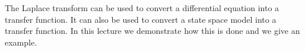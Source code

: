 \def\FileDate{99/10/06}
\def\FileVersion{1.2}

The Laplace transform can be used to convert a differential equation
into a transfer function. It can also be used to convert a state space
model into a transfer function. In this lecture we demonstrate how
this is done and we give an example.

\ifslidesonly
\begin{slide}
  
\end{slide}
\fi


\ifslidesonly
\begin{slide}
  
\end{slide}
\fi


\ifslidesonly
\begin{slide}
  
\end{slide}
\fi

\ifslidesonly
  \begin{slide}
    
  \end{slide}
\fi


